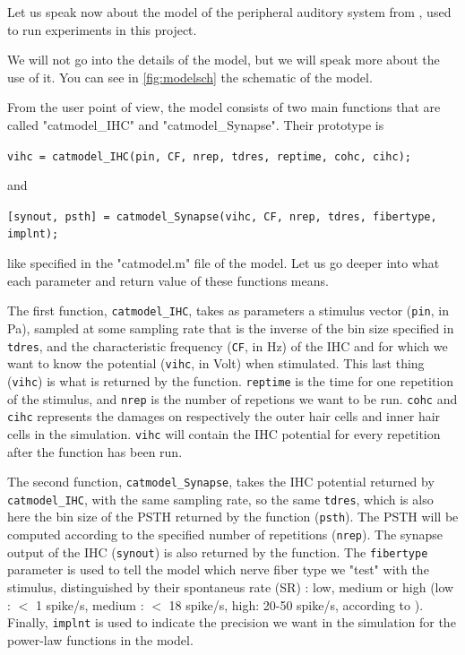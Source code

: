 Let us speak now about the model of the peripheral auditory system from 
\cite{Model1, Model2, Model3}, used to run experiments in this project. 

We will not go into the details of the model, but we will speak more about the use of it. 
You can see in \autoref{fig:modelsch} the schematic of the model.



From the user point of view, the model consists of two main functions 
that are called "catmodel\_IHC" and "catmodel\_Synapse". Their prototype is

\texttt{vihc = catmodel\_IHC(pin, CF, nrep, tdres, reptime, cohc, cihc);}

and

\texttt{[synout, psth] = catmodel\_Synapse(vihc, CF, nrep, tdres, fibertype, implnt);}

like specified in the "catmodel.m" file of the model. 
Let us go deeper into what each parameter and return value of these functions means.

The first function, \texttt{catmodel\_IHC}, takes as parameters 
a stimulus vector (\texttt{pin}, in Pa), sampled at some sampling rate 
that is the inverse of the bin size specified in \texttt{tdres}, and 
the characteristic frequency (\texttt{CF}, in Hz) 
of the IHC and for which we want to know the potential 
(\texttt{vihc}, in Volt) when stimulated. 
This last thing (\texttt{vihc}) is what is returned by the function. 
\texttt{reptime} is the time for one repetition of the stimulus, 
and \texttt{nrep} is the number of repetions we want to be run. 
\texttt{cohc} and \texttt{cihc} represents the damages on respectively 
the outer hair cells and inner hair cells in the simulation.
\texttt{vihc} will contain the IHC potential for every repetition 
after the function has been run.

The second function, \texttt{catmodel\_Synapse}, 
takes the IHC potential returned by \texttt{catmodel\_IHC}, 
with the same sampling rate, so the same \texttt{tdres}, which is also here the bin size
of the PSTH returned by the function (\texttt{psth}). 
The PSTH will be computed according to the specified number of repetitions (\texttt{nrep}).
The synapse output of the IHC (\texttt{synout}) is also returned by the function.
The \texttt{fibertype} parameter is used to tell the model which nerve fiber type
we "test" with the stimulus, distinguished by their spontaneus rate (SR) : 
low, medium or high (low : $<$ 1 spike/s, medium : $<$ 18 spike/s, high: 20-50 spike/s, 
according to \cite{AuditoryNeuroscience}). %
Finally, \texttt{implnt} is used to indicate the precision we want in the simulation 
for the power-law functions in the model.

